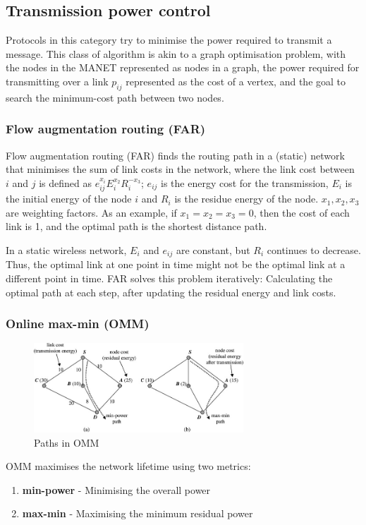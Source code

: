 \subsection{Transmission power control}
Protocols in this category try to minimise the power required to transmit
a message. This class of algorithm is akin to a graph optimisation problem,
with the nodes in the MANET represented as nodes in a graph, the power required for
transmitting over a link $p_{ij}$ represented as the cost of a vertex, and the goal
to search the minimum-cost path between two nodes.

\subsubsection{Flow augmentation routing (FAR)}
Flow augmentation routing (FAR)\cite{chang2000energy} finds the routing
path in a (static) network that minimises the sum of link costs in the network,
where the link cost between $i$ and $j$ is defined as \( e_{ij}^{x_{i}}E_{i}^{x_{2}}R_{i}^{-x_{3}}\);
\(e_{ij}\) is the energy cost for the transmission, $E_{i}$ is the initial energy
of the node $i$ and $R_{i}$ is the residue energy of the node. \(x_{1}, x_{2}, x_{3}\)
are weighting factors. As an example, if $x_{1}=x_{2}=x_{3}=0$, then the cost
of each link is 1, and the optimal path is the shortest distance path.

In a static wireless network, $E_{i}$ and $e_{ij}$ are constant, but $R_{i}$
continues to decrease. Thus, the optimal link at one point in time might not be the
optimal link at a different point in time. FAR solves this problem iteratively:
Calculating the optimal path at each step, after updating the residual energy
and link costs.

\subsubsection{Online max-min (OMM)}
\begin{figure}
\centering
\includegraphics[width=0.7\textwidth]{images/omm}
\caption{Paths in OMM\cite{alotaibi2012survey}}
\label{ommex}
\end{figure}
\label{omm}
OMM \cite{li2001online} maximises the network lifetime using two metrics:
\begin{enumerate}
  \item \textbf{min-power} - Minimising the overall power
  \item \textbf{max-min} - Maximising the minimum residual power
\end{enumerate}

